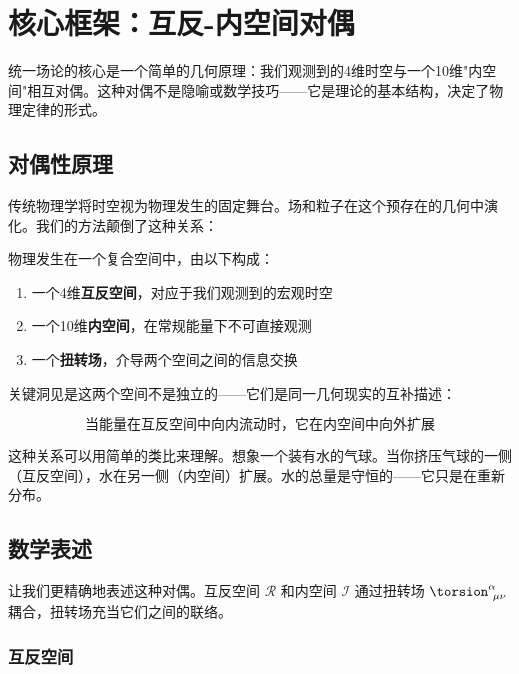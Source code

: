 \section{核心框架：互反-内空间对偶}
\label{sec:framework}

统一场论的核心是一个简单的几何原理：我们观测到的4维时空与一个10维"内空间"相互对偶。这种对偶不是隐喻或数学技巧——它是理论的基本结构，决定了物理定律的形式。

\subsection{对偶性原理}

传统物理学将时空视为物理发生的固定舞台。场和粒子在这个预存在的几何中演化。我们的方法颠倒了这种关系：

\begin{axiom}[空间对偶]
物理发生在一个复合空间中，由以下构成：
\begin{enumerate}
    \item 一个4维\textbf{互反空间}，对应于我们观测到的宏观时空
    \item 一个10维\textbf{内空间}，在常规能量下不可直接观测
    \item 一个\textbf{扭转场}，介导两个空间之间的信息交换
\end{enumerate}
\end{axiom}

关键洞见是这两个空间不是独立的——它们是同一几何现实的互补描述：

\begin{equation}
\boxed{\text{当能量在互反空间中向内流动时，它在内空间中向外扩展}}
\end{equation}

这种关系可以用简单的类比来理解。想象一个装有水的气球。当你挤压气球的一侧（互反空间），水在另一侧（内空间）扩展。水的总量是守恒的——它只是在重新分布。

\subsection{数学表述}

让我们更精确地表述这种对偶。互反空间 $\mathcal{R}$ 和内空间 $\mathcal{I}$ 通过扭转场 $\torsion^\alpha_{\ \mu\nu}$ 耦合，扭转场充当它们之间的联络。

\subsubsection{互反空间}


